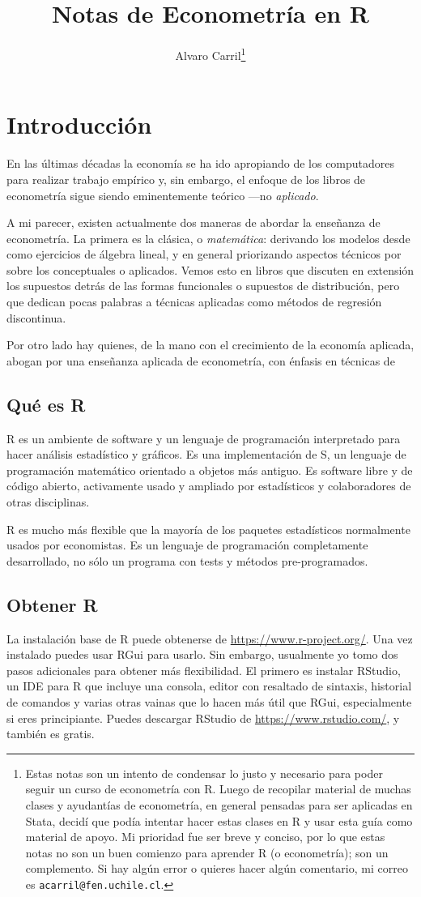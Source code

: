 \documentclass{article}\usepackage[]{graphicx}\usepackage[]{color}
\title{Notas de Econometría en R}
\author{Alvaro Carril\thanks{Estas notas son un intento de condensar lo justo y necesario para poder seguir un curso de econometría con R.
Luego de recopilar material de muchas clases y ayudantías de econometría, en general pensadas para ser aplicadas en Stata, decidí que podía intentar hacer estas clases en R y usar esta guía como material de apoyo.
Mi prioridad fue ser breve y conciso, por lo que estas notas no son un buen comienzo para aprender R (o econometría); son un complemento.
Si hay algún error o quieres hacer algún comentario, mi correo es \texttt{acarril@fen.uchile.cl}.}}
\begin{document}
\maketitle
\tableofcontents

\clearpage

\section{Introducción}

En las últimas décadas la economía se ha ido apropiando de los computadores para realizar trabajo empírico y, sin embargo, el enfoque de los libros de econometría sigue siendo eminentemente teórico ---no \emph{aplicado}.

A mi parecer, existen actualmente dos maneras de abordar la enseñanza de econometría. La primera es la clásica, o \emph{matemática}: derivando los modelos desde como ejercicios de álgebra lineal, y en general priorizando aspectos técnicos por sobre los conceptuales o aplicados. Vemos esto en libros que discuten en extensión los supuestos detrás de las formas funcionales o supuestos de distribución, pero que dedican pocas palabras a técnicas aplicadas como métodos de regresión discontinua.

Por otro lado hay quienes, de la mano con el crecimiento de la economía aplicada, abogan por una enseñanza aplicada de econometría, con énfasis en técnicas de 

\subsection{Qué es R}

R es un ambiente de software y un lenguaje de programación interpretado para hacer análisis estadístico y gráficos. Es una implementación de S, un lenguaje de programación matemático orientado a objetos más antiguo. Es software libre y de código abierto, activamente usado y ampliado por estadísticos y colaboradores de otras disciplinas.

R es mucho más flexible que la mayoría de los paquetes estadísticos normalmente usados por economistas. Es un lenguaje de programación completamente desarrollado, no sólo un programa con tests y métodos pre-programados.


\subsection{Obtener R}

La instalación base de R puede obtenerse de \url{https://www.r-project.org/}. Una vez instalado puedes usar RGui para usarlo. Sin embargo, usualmente yo tomo dos pasos adicionales para obtener más flexibilidad. El primero es instalar RStudio, un IDE para R que incluye una consola, editor con resaltado de sintaxis, historial de comandos y varias otras vainas que lo hacen más útil que RGui, especialmente si eres principiante. Puedes descargar RStudio de \url{https://www.rstudio.com/}, y también es gratis.
\end{document}
